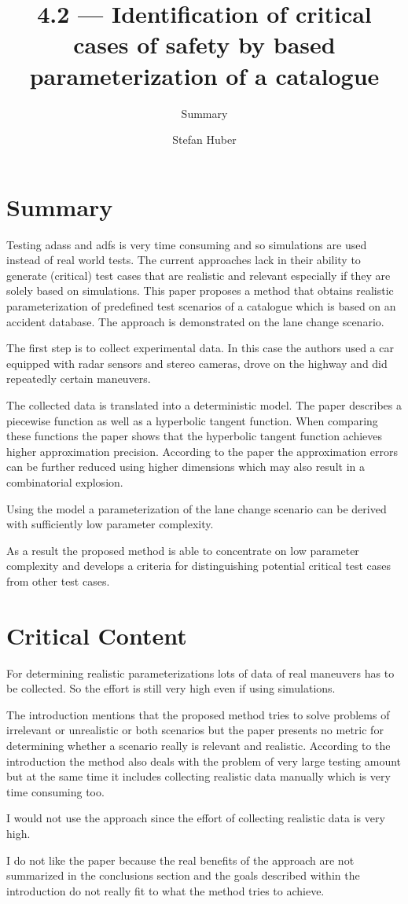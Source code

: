 \documentclass[oneside, notitlepage, twocolumn]{scrartcl}
\title{\LARGE 4.2 --- Identification of critical cases of \glstext{adas} safety by \glstext{fot} based parameterization of a catalogue}
\subtitle{Summary}
\author{Stefan Huber}
\begin{document}
\maketitle

\section{Summary}
Testing \glspl{adas} and \glspl{adf} is very time consuming and so simulations are used instead of real world tests.
The current approaches lack in their ability to generate (critical) test cases that are realistic and relevant especially if they are solely based on simulations.
This paper proposes a method that obtains realistic parameterization of predefined test scenarios of a catalogue which is based on an accident database.
The approach is demonstrated on the lane change scenario.\par
The first step is to collect experimental data.
In this case the authors used a car equipped with radar sensors and stereo cameras, drove on the highway and did repeatedly certain maneuvers.\par
The collected data is translated into a deterministic model.
The paper describes a piecewise function as well as a hyperbolic tangent function.
When comparing these functions the paper shows that the hyperbolic tangent function achieves higher approximation precision.
According to the paper the approximation errors can be further reduced using higher dimensions which may also result in a combinatorial explosion.\par
Using the model a parameterization of the lane change scenario can be derived with sufficiently low parameter complexity.\par
As a result the proposed method is able to concentrate on low parameter complexity and develops a criteria for distinguishing potential critical test cases from other test cases.

\section{Critical Content}
For determining realistic parameterizations lots of data of real maneuvers has to be collected.
So the effort is still very high even if using simulations.\par
The introduction mentions that the proposed method tries to solve problems of irrelevant or unrealistic or both scenarios but the paper presents no metric for determining whether a scenario really is relevant and realistic.
According to the introduction the method also deals with the problem of very large testing amount but at the same time it includes collecting realistic data manually which is very time consuming too.\par
I would not use the approach since the effort of collecting realistic data is very high.\par
I do not like the paper because the real benefits of the approach are not summarized in the conclusions section and the goals described within the introduction do not really fit to what the method tries to achieve.
\end{document}
